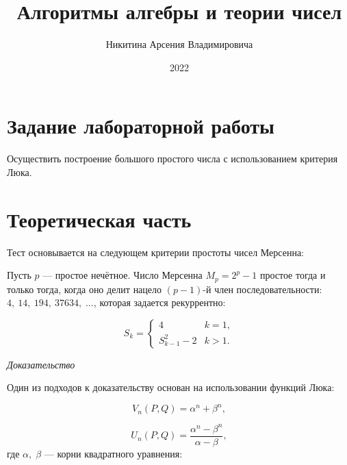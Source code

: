 \documentclass[bachelor, och, labwork]{shiza}
\begin{document}
\title{Алгоритмы алгебры и теории чисел}





\author{Никитина Арсения Владимировича}




\date{2022}

\maketitle



\tableofcontents

\section{Задание лабораторной работы}

Осуществить построение большого простого числа с использованием критерия Люка.

\section{Теоретическая часть}

Тест основывается на следующем критерии простоты чисел Мерсенна:

Пусть $p$ --- простое нечётное. Число Мерсенна $M_{p}=2^{p}-1$ простое тогда и 
только тогда, когда оно делит нацело $(p-1)$-й член последовательности:
$ 4,~14,~194,~37634,\;\ldots$, которая задается рекуррентно:

$$S_{k}={\begin{cases}4&k=1,\\S_{k-1}^{2}-2&k>1.\end{cases}}$$

\begin{center}
    \textit{Доказательство}
\end{center}

Один из подходов к доказательству основан на использовании функций Люка:

$${V_{n}(P,Q)=\alpha ^{n}+\beta ^{n},}$$

$$U_{n}(P,Q)={\frac {\alpha ^{n}-\beta ^{n}}{\alpha -\beta }},$$
где $\alpha ,\;\beta $  --- корни квадратного уравнения:
\end{document}
